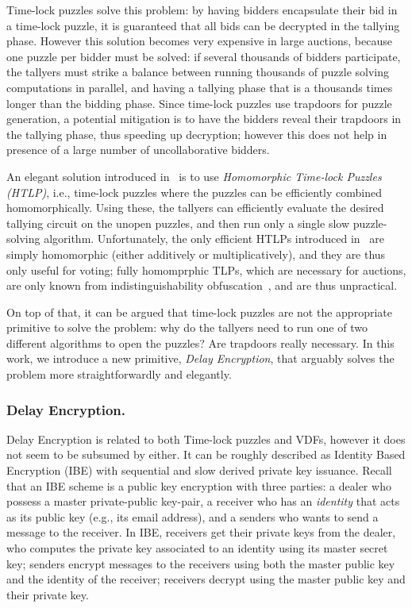 \documentclass{llncs}
\begin{document}
Time-lock puzzles solve this problem: by having bidders encapsulate
their bid in a time-lock puzzle, it is guaranteed that all bids can be
decrypted in the tallying phase. %
However this solution becomes very expensive in large auctions,
because one puzzle per bidder must be solved: if several thousands of
bidders participate, the tallyers must strike a balance between
running thousands of puzzle solving computations in parallel, and
having a tallying phase that is a thousands times longer than the
bidding phase. %
Since time-lock puzzles use trapdoors for puzzle generation, a
potential mitigation is to have the bidders reveal their trapdoors in
the tallying phase, thus speeding up decryption; however this does not
help in presence of a large number of uncollaborative bidders.

An elegant solution introduced in~\cite{C:MalThy19} is to use
\emph{Homomorphic Time-lock Puzzles (HTLP)}, i.e., time-lock puzzles
where the puzzles can be efficiently combined homomorphically. %
Using these, the tallyers can efficiently evaluate the desired
tallying circuit on the unopen puzzles, and then run only a single
slow puzzle-solving algorithm. %
Unfortunately, the only efficient HTLPs introduced
in~\cite{C:MalThy19} are simply homomorphic (either additively or
multiplicatively), and they are thus only useful for voting; fully
homomprphic TLPs, which are necessary for auctions, are only known
from indistinguishability obfuscation~\cite{FOCS:GGHRSW13}, and are
thus unpractical. %

On top of that, it can be argued that time-lock puzzles are not the
appropriate primitive to solve the problem: why do the tallyers need
to run one of two different algorithms to open the puzzles? Are
trapdoors really necessary. %
In this work, we introduce a new primitive, \emph{Delay Encryption},
that arguably solves the problem more straightforwardly and elegantly.


\subsubsection{Delay Encryption.}
Delay Encryption is related to both Time-lock puzzles and VDFs,
however it does not seem to be subsumed by either. %
It can be roughly described as Identity Based Encryption (IBE) with
sequential and slow derived private key issuance. %
Recall that an IBE scheme is a public key encryption with three
parties: a dealer who possess a master private-public key-pair, a
receiver who has an \emph{identity} that acts as its public key (e.g.,
its email address), and a senders who wants to send a message to the
receiver. %
In IBE, receivers get their private keys from the dealer, who computes
the private key associated to an identity using its master secret key;
senders encrypt messages to the receivers using both the master public
key and the identity of the receiver; receivers decrypt using the
master public key and their private key.
\end{document}
